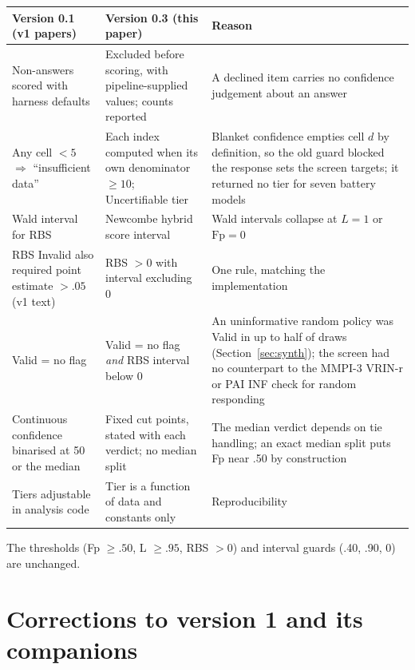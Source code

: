 \documentclass[11pt,a4paper]{article}
\begin{document}
\begin{center}
\small
\begin{tabular}{p{4.2cm} p{4.6cm} p{5.6cm}}
\toprule
Version 0.1 (v1 papers) & Version 0.3 (this paper) & Reason \\
\midrule
Non-answers scored with harness defaults & Excluded before scoring, with pipeline-supplied values; counts reported & A declined item carries no confidence judgement about an answer \\
Any cell $< 5$ $\Rightarrow$ ``insufficient data'' & Each index computed when its own denominator $\geq 10$; Uncertifiable tier & Blanket confidence empties cell $d$ by definition, so the old guard blocked the response sets the screen targets; it returned no tier for seven battery models \\
Wald interval for RBS & Newcombe hybrid score interval & Wald intervals collapse at $L = 1$ or $\text{Fp} = 0$ \\
RBS Invalid also required point estimate $> .05$ (v1 text) & RBS $> 0$ with interval excluding 0 & One rule, matching the implementation \\
Valid = no flag & Valid = no flag \emph{and} RBS interval below 0 & An uninformative random policy was Valid in up to half of draws (Section~\ref{sec:synth}); the screen had no counterpart to the MMPI-3 VRIN-r or PAI INF check for random responding \\
Continuous confidence binarised at 50 or the median & Fixed cut points, stated with each verdict; no median split & The median verdict depends on tie handling; an exact median split puts Fp near .50 by construction \\
Tiers adjustable in analysis code & Tier is a function of data and constants only & Reproducibility \\
\bottomrule
\end{tabular}
\end{center}
\noindent The thresholds (Fp $\geq .50$, L $\geq .95$, RBS $> 0$) and interval guards (.40, .90, 0) are unchanged.

\section{Corrections to version 1 and its companions}\label{app:corrections}
\end{document}
